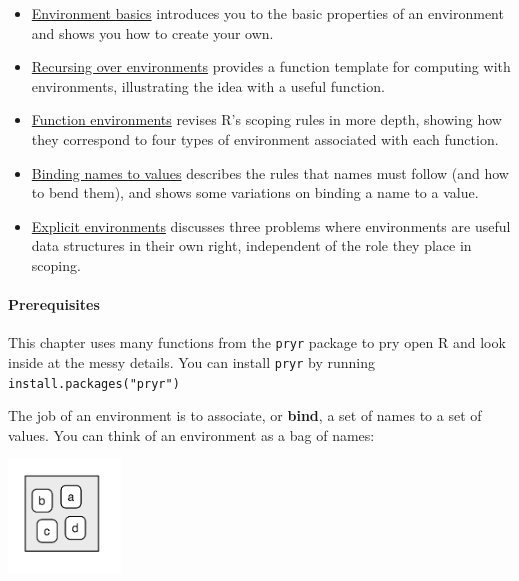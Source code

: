 \begin{itemize}
\item
  \hyperref[env-basics]{Environment basics} introduces you to the basic
  properties of an environment and shows you how to create your own.
\item
  \hyperref[env-recursion]{Recursing over environments} provides a
  function template for computing with environments, illustrating the
  idea with a useful function.
\item
  \hyperref[function-envs]{Function environments} revises R's scoping
  rules in more depth, showing how they correspond to four types of
  environment associated with each function.
\item
  \hyperref[binding]{Binding names to values} describes the rules that
  names must follow (and how to bend them), and shows some variations on
  binding a name to a value.
\item
  \hyperref[explicit-envs]{Explicit environments} discusses three
  problems where environments are useful data structures in their own
  right, independent of the role they place in scoping.
\end{itemize}

\paragraph{Prerequisites}

This chapter uses many functions from the \texttt{pryr} package to pry
open R and look inside at the messy details. You can install
\texttt{pryr} by running \texttt{install.packages("pryr")}


The job of an environment is to associate, or \textbf{bind}, a set of
names to a set of values. You can think of an environment as a bag of
names:  

\includegraphics[width=1.18in]{diagrams/environments.png/bag-of-names.png}

